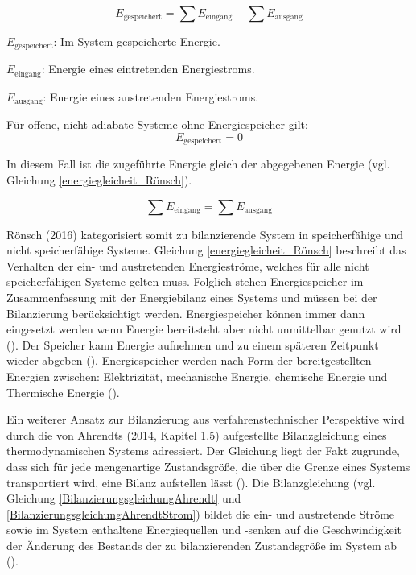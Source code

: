 \begin{equation}
E_{\text{gespeichert}} = \sum E_{\text{eingang}} - \sum E_{\text{ausgang}}
\label{energiebilanzierungsgleichung_Rönsch}
\end{equation}

\begin{description}
    \item \(E_{\text{gespeichert}}\): Im System gespeicherte Energie.
    \item \(E_{\text{eingang}}\): Energie eines eintretenden Energiestroms.
    \item \(E_{\text{ausgang}}\): Energie eines austretenden Energiestroms.
    \item Für offene, nicht-adiabate Systeme ohne Energiespeicher gilt:
    \[
    E_{\text{gespeichert}} = 0
    \]
    \item In diesem Fall ist die zugeführte Energie gleich der abgegebenen Energie (vgl. Gleichung \eqref{energiegleicheit_Rönsch}).
\end{description}

\begin{equation}
    \sum E_{\text{eingang}} = \sum E_{\text{ausgang}}
    \label{energiegleicheit_Rönsch}
\end{equation}

Rönsch (2016) kategorisiert somit zu bilanzierende System in speicherfähige und nicht speicherfähige Systeme.
Gleichung \eqref{energiegleicheit_Rönsch} beschreibt das Verhalten der ein- und austretenden Energieströme, welches für alle 
nicht speicherfähigen Systeme gelten muss.
Folglich stehen Energiespeicher im Zusammenfassung mit der Energiebilanz eines Systems und müssen bei der Bilanzierung berücksichtigt werden.
Energiespeicher können immer dann eingesetzt werden wenn Energie bereitsteht aber nicht unmittelbar genutzt wird (\cite[S. 1]{Rathgeber.2018}).
Der Speicher kann Energie aufnehmen und zu einem späteren Zeitpunkt wieder abgeben (\cite[S. 1]{Rathgeber.2018}).
Energiespeicher werden nach Form der bereitgestellten Energien zwischen: Elektrizität, mechanische Energie, chemische Energie und Thermische 
Energie (\cite[S. 1]{Rathgeber.2018}).


Ein weiterer Ansatz zur Bilanzierung aus verfahrenstechnischer Perspektive wird durch die von Ahrendts (2014, Kapitel 1.5) aufgestellte Bilanzgleichung eines 
thermodynamischen Systems adressiert.
Der Gleichung liegt der Fakt zugrunde, dass sich für jede mengenartige Zustandsgröße, die über die Grenze eines Systems transportiert wird, eine Bilanz aufstellen lässt 
(\cite[Kapitel 1.5]{Ahrendts.2014}).
Die Bilanzgleichung (vgl. Gleichung \eqref{BilanzierungsgleichungAhrendt} und \eqref{BilanzierungsgleichungAhrendtStrom}) 
bildet die ein- und austretende Ströme sowie im System enthaltene Energiequellen und -senken auf die Geschwindigkeit der Änderung des Bestands der 
zu bilanzierenden Zustandsgröße im System ab (\cite[Kapitel 1.5]{Ahrendts.2014}).


